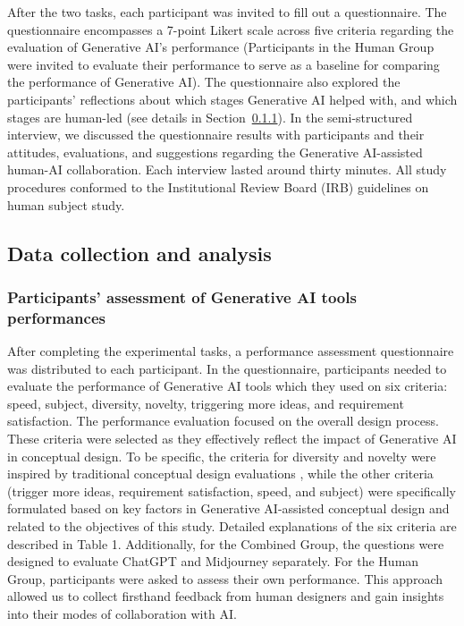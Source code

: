 \documentclass{dsj}
\begin{document}
After the two tasks, each participant was invited to fill out a questionnaire. The questionnaire encompasses a 7-point Likert scale across five criteria regarding the evaluation of Generative AI’s performance (Participants in the Human Group were invited to evaluate their performance to serve as a baseline for comparing the performance of Generative AI). The questionnaire also explored the participants' reflections about which stages Generative AI helped with, and which stages are human-led (see details in Section~\ref{section_3.3.1}). In the semi-structured interview, we discussed the questionnaire results with participants and their attitudes, evaluations, and suggestions regarding the Generative AI-assisted human-AI collaboration. Each interview lasted around thirty minutes. All study procedures conformed to the Institutional Review Board (IRB) guidelines on human subject study.

\subsection{Data collection and analysis}
\subsubsection{Participants’ assessment of Generative AI tools performances}
\label{section_3.3.1}
After completing the experimental tasks, a performance assessment questionnaire was distributed to each participant. In the questionnaire, participants needed to evaluate the performance of Generative AI tools which they used on six criteria: speed, subject, diversity, novelty, triggering more ideas, and requirement satisfaction. The performance evaluation focused on the overall design process. These criteria were selected as they effectively reflect the impact of Generative AI in conceptual design. To be specific, the criteria for diversity and novelty were inspired by traditional conceptual design evaluations \citep{shah2003metrics}, while the other criteria (trigger more ideas, requirement satisfaction, speed, and subject) were specifically formulated based on key factors in Generative AI-assisted conceptual design and related to the objectives of this study. Detailed explanations of the six criteria are described in Table 1. Additionally, for the Combined Group, the questions were designed to evaluate ChatGPT and Midjourney separately. For the Human Group, participants were asked to assess their own performance. This approach allowed us to collect firsthand feedback from human designers and gain insights into their modes of collaboration with AI. 
\end{document}
